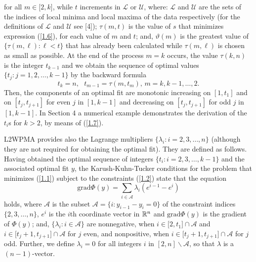 \documentclass[acmtoms]{acmtrans2m}
\begin{document}
for all $m\in \lbrack 2,k]$, while $t$ increments in $\mathscr{L}$ or $%
\mathscr{U}$, where: $\mathscr{L}$ and $\mathscr{U}$ are the sets of the
indices of local minima and local maxima of the data respectively (for the
definitions of $\mathscr{L}$ and $\mathscr{U}$ see [4]); $\tau (m,t)$ is the
value of $s$ that minimizes expression (\ref{1.6}), for each value of $m$
and $t$; and, $\vartheta (m)$ is the greatest value of $\{\tau (m,\ell
):\ell <t\}$ that has already been calculated while $\tau (m,\ell )$ is
chosen as small as possible. At the end of the process $m=k$ occurs, the
value $\tau (k,n)$ is the integer $t_{k-1}$ and we obtain the sequence of
optimal values $\{t_{j}:j=1,2,\ldots ,k-1\}$ by the backward formula 
\begin{equation}
t_{k}=n,\text{ }t_{m-1}=\tau (m,t_{m})\text{, \ \ \ }m=k,k-1,\ldots ,2.
\label{1.7}
\end{equation}
Then, the components of an optimal fit are monotonic increasing on $%
[1,t_{1}] $ and on $[t_{j},t_{j+1}]$ for even $j$ in $[1,k-1]$ and
decreasing on $[t_{j},t_{j+1}]$ for odd $j$ in $[1,k-1]$. In Section 4 a
numerical example demonstrates the derivation of the $t_{i}$s for $k>2$, by
means of (\ref{1.7}).

L2WPMA provides also the Lagrange multipliers $\{\lambda _{i}:i=2,3,\ldots
,n\}$ (although they are not required for obtaining the optimal fit). They
are defined as follows. Having obtained the optimal sequence of integers $%
\{t_{i}:i=2,3,\ldots ,k-1\}$ and the associated optimal fit $y$, the
Karush-Kuhn-Tucker conditions for the problem that minimizes (\ref{1.1})
subject to the constraints (\ref{1.2}) state that the equation 
\begin{equation}
\text{grad}\Phi (y)=\sum_{i\in \mathscr{A}}\lambda _{i}(e^{i-1}-e^{i})
\label{1.8}
\end{equation}
holds, where $\mathscr{A}$ is the subset $\mathscr{A}=\{i:y_{i-1}-y_{i}=0\}$
of the constraint indices $\{2,3,\ldots ,n\}$, $e^{i}$ is the $i$th
coordinate vector in $\Bbb{R}^{n}$ and $\text{grad}\Phi (y)$ is the gradient
of $\Phi (y)$; and, $\{\lambda _{i}:i\in \mathscr{A}\}$ are nonnegative,
when $i\in \lbrack 2,t_{1}]\cap \mathscr{A}$ and $i\in \lbrack
t_{j}+1,t_{j+1}]\cap \mathscr{A}$ for $j$ even, and nonpositive, when $i\in
\lbrack t_{j}+1,t_{j+1}]\cap \mathscr{A}$ for $j$ odd. Further, we define $%
\lambda _{i}=0$ for all integers $i$ in $[2,n]\backslash \mathscr{A}$, so
that $\lambda $ is a $(n-1)$-vector.
\end{document}

